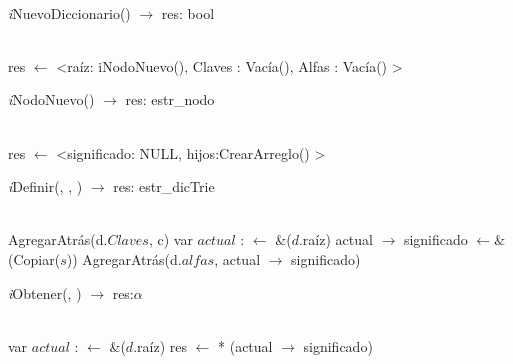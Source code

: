 \begin{Algoritmos}
 \incmargin{1em}
    \dontprintsemicolon
\\
\tab\textit{i}NuevoDiccionario() $\longrightarrow$ res: bool\\
\hspace*{9mm}\\
\begin{algorithm}[H]
	res $\leftarrow$ <raíz: iNodoNuevo(), Claves : Vacía(), Alfas : Vacía() > 
\end{algorithm}

\textit{i}NodoNuevo() $\longrightarrow$ res: estr\_nodo\\
\hspace*{9mm}\\
\begin{algorithm}[H]
	res $\leftarrow$ <significado: NULL, hijos:CrearArreglo() > 
\end{algorithm}

\textit{i}Definir(, , ) $\longrightarrow$ res: estr\_dicTrie\\
\hspace*{9mm}\\
\begin{algorithm}[H]
	AgregarAtrás(d.$Claves$, c) 
	var $actual$ :  $\leftarrow$ \&($d$.raíz) 
	actual $\rightarrow$ significado $\leftarrow \&$(Copiar($s$)) 
	AgregarAtrás(d.$alfas$, actual $\rightarrow$ significado) 
\end{algorithm}

\textit{i}Obtener(, ) $\longrightarrow$ res:$\alpha$ \\
\hspace*{9mm}\\
\begin{algorithm}[H]
	var $actual$ :  $\leftarrow$ \&($d$.raíz)
	res $\leftarrow$ * (actual $\rightarrow$ significado) 
\end{algorithm}


\end{Algoritmos}
